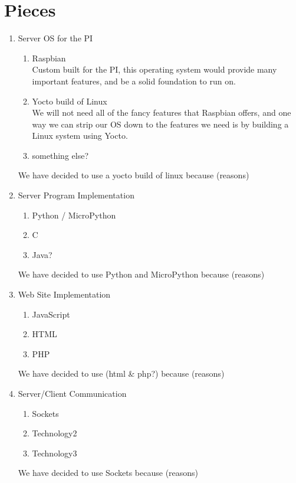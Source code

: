 \documentclass[12pt]{article}
\begin{document}
\section{Pieces}

\begin{enumerate}
    \item Server OS for the PI
        \begin{enumerate}
            \item Raspbian \\
                Custom built for the PI, this operating system would provide many important features, and be a solid foundation to run on.
            \item Yocto build of Linux \\
                We will not need all of the fancy features that Raspbian offers, and one way we can strip our OS down to the features we need is by building a Linux system using Yocto.
            \item something else?
        \end{enumerate}
        We have decided to use a yocto build of linux because (reasons)
    \item Server Program Implementation
        \begin{enumerate}
            \item Python / MicroPython
            \item C
            \item Java?
        \end{enumerate}
        We have decided to use Python and MicroPython because (reasons)
    \item Web Site Implementation
        \begin{enumerate}
            \item JavaScript
            \item HTML
            \item PHP
        \end{enumerate}
        We have decided to use (html \& php?) because (reasons)
    \item Server/Client Communication
        \begin{enumerate}
            \item Sockets
            \item Technology2
            \item Technology3
        \end{enumerate}
        We have decided to use Sockets because (reasons)
\end{enumerate}
    
\end{document}

